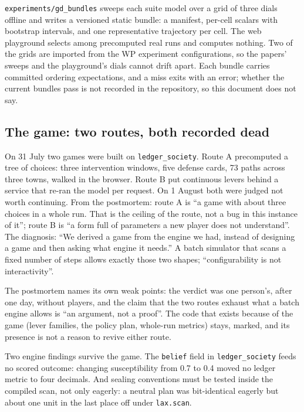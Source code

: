 \documentclass[11pt]{article}
\newcommand{\code}[1]{\texttt{#1}}
\begin{document}
\code{experiments/gd\_bundles} sweeps each suite model over a grid of three dials
offline and writes a versioned static bundle: a manifest, per-cell scalars with
bootstrap intervals, and one representative trajectory per cell. The web playground
selects among precomputed real runs and computes nothing. Two of the grids are imported
from the WP experiment configurations, so the papers' sweeps and the playground's dials
cannot drift apart. Each bundle carries committed ordering expectations, and a miss
exits with an error; whether the current bundles pass is not recorded in the
repository, so this document does not say.

\subsection{The game: two routes, both recorded dead}

On 31 July two games were built on \code{ledger\_society}. Route A precomputed a tree
of choices: three intervention windows, five defense cards, 73 paths across three towns,
walked in the browser. Route B put continuous levers behind a service that re-ran the
model per request. On 1 August both were judged not worth continuing. From the
postmortem: route A is ``a game with about three choices in a whole run. That is the
ceiling of the route, not a bug in this instance of it''; route B is ``a form full of
parameters a new player does not understand''. The diagnosis: ``We derived a game from
the engine we had, instead of designing a game and then asking what engine it needs.''
A batch simulator that scans a fixed number of steps allows exactly those two shapes;
``configurability is not interactivity''.

The postmortem names its own weak points: the verdict was one person's, after one day,
without players, and the claim that the two routes exhaust what a batch engine allows
is ``an argument, not a proof''. The code that exists because of the game (lever
families, the policy plan, whole-run metrics) stays, marked, and its presence is not a
reason to revive either route.

Two engine findings survive the game. The \code{belief} field in \code{ledger\_society}
feeds no scored outcome: changing susceptibility from 0.7 to 0.4 moved no ledger metric
to four decimals. And sealing conventions must be tested inside the compiled scan, not
only eagerly: a neutral plan was bit-identical eagerly but about one unit in the last
place off under \code{lax.scan}.
\end{document}
